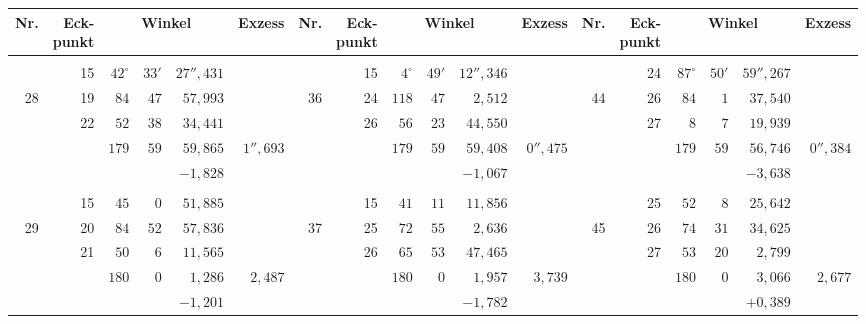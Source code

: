\begin{center}
\begingroup
\fontsize{7.6}{9.2}\selectfont
\setlength{\tabcolsep}{2.1pt}
\renewcommand{\arraystretch}{1.04}
\begin{tabular}{|r|r|r@{\;}r@{\;}r|r||r|r|r@{\;}r@{\;}r|r||r|r|r@{\;}r@{\;}r|r|}
\hline
Nr.&\shortstack{\rule{0pt}{2.5ex}Eck-\\punkt}&\multicolumn{3}{c|}{Winkel}&Exzess & Nr.&\shortstack{\rule{0pt}{2.5ex}Eck-\\punkt}&\multicolumn{3}{c|}{Winkel}&Exzess & Nr.&\shortstack{\rule{0pt}{2.5ex}Eck-\\punkt}&\multicolumn{3}{c|}{Winkel}&Exzess\\ \hline
 &  &  &  &  &  &  &  &  &  &  &  &  &  &  &  &  & \\
 & 15 & $42^\circ$ & $33'$ & $27''{,}431$ &  &  & 15 & $4^\circ$ & $49'$ & $12''{,}346$ &  &  & 24 & $87^\circ$ & $50'$ & $59''{,}267$ & \\
28 & 19 & $84$ & $47$ & $57{,}993$ &  & 36 & 24 & $118$ & $47$ & $2{,}512$ &  & 44 & 26 & $84$ & $1$ & $37{,}540$ & \\
 & 22 & $52$ & $38$ & $34{,}441$ &  &  & 26 & $56$ & $23$ & $44{,}550$ &  &  & 27 & $8$ & $7$ & $19{,}939$ & \\
\cline{3-5}\cline{9-11}\cline{15-17}
 &  & $179$ & $59$ & $59{,}865$ & $1''{,}693$ &  &  & $179$ & $59$ & $59{,}408$ & $0''{,}475$ &  &  & $179$ & $59$ & $56{,}746$ & $0''{,}384$\\
 &  & \multicolumn{3}{r|}{$-1{,}828$} &  &  &  & \multicolumn{3}{r|}{$-1{,}067$} &  &  &  & \multicolumn{3}{r|}{$-3{,}638$} & \\
 &  &  &  &  &  &  &  &  &  &  &  &  &  &  &  &  & \\
 & 15 & $45$ & $0$ & $51{,}885$ &  &  & 15 & $41$ & $11$ & $11{,}856$ &  &  & 25 & $52$ & $8$ & $25{,}642$ & \\
29 & 20 & $84$ & $52$ & $57{,}836$ &  & 37 & 25 & $72$ & $55$ & $2{,}636$ &  & 45 & 26 & $74$ & $31$ & $34{,}625$ & \\
 & 21 & $50$ & $6$ & $11{,}565$ &  &  & 26 & $65$ & $53$ & $47{,}465$ &  &  & 27 & $53$ & $20$ & $2{,}799$ & \\
\cline{3-5}\cline{9-11}\cline{15-17}
 &  & $180$ & $0$ & $1{,}286$ & $2{,}487$ &  &  & $180$ & $0$ & $1{,}957$ & $3{,}739$ &  &  & $180$ & $0$ & $3{,}066$ & $2{,}677$\\
 &  & \multicolumn{3}{r|}{$-1{,}201$} &  &  &  & \multicolumn{3}{r|}{$-1{,}782$} &  &  &  & \multicolumn{3}{r|}{$+0{,}389$} & \\

\end{tabular}
\end{center}
